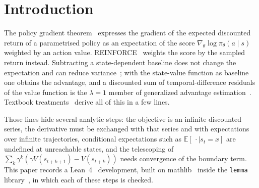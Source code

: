 \documentclass[11pt,a4paper]{article}
\newcommand{\E}{\mathbb{E}}
\newcommand{\grad}{\nabla_{\theta}}
\begin{document}
\section{Introduction}
\label{sec:intro}

The policy gradient theorem~\cite{sutton2000policy} expresses the gradient of the expected discounted return of a parametrised policy as an expectation of the score $\grad\log\pi_\theta(a\mid s)$ weighted by an action value.
REINFORCE~\cite{williams1992simple} weights the score by the sampled return instead.
Subtracting a state-dependent baseline does not change the expectation and can reduce variance~\cite{williams1992simple,greensmith2004variance}; with the state-value function as baseline one obtains the advantage, and a discounted sum of temporal-difference residuals of the value function is the $\lambda=1$ member of generalized advantage estimation~\cite{schulman2016gae}.
Textbook treatments~\cite{sutton2018reinforcement} derive all of this in a few lines.

Those lines hide several analytic steps: the objective is an infinite discounted series, the derivative must be exchanged with that series and with expectations over infinite trajectories, conditional expectations such as $\E[\,\cdot\mid s_t=x]$ are undefined at unreachable states, and the telescoping of $\sum_k\gamma^k(\gamma V(s_{t+k+1})-V(s_{t+k}))$ needs convergence of the boundary term.
This paper records a Lean~4~\cite{moura2021lean4} development, built on mathlib~\cite{mathlib2020,mathlib} inside the \texttt{lemma} library~\cite{lemma_repo}, in which each of these steps is checked.
\end{document}
